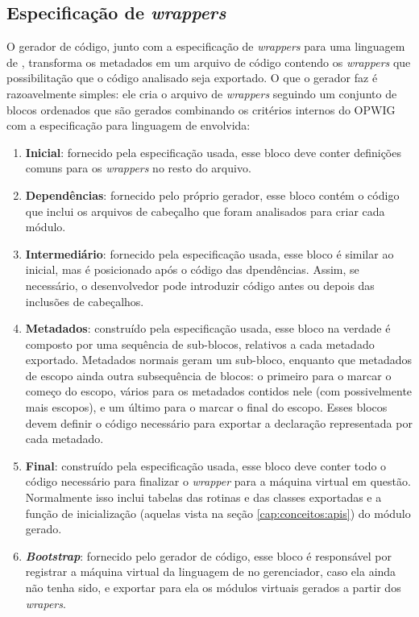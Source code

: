   \subsection{Especificação de \textit{wrappers}}
  O gerador de código, junto com a especificação de \textit{wrappers} para uma linguagem de \script{},
  transforma os metadados em um arquivo de código \CXX{} contendo os \textit{wrappers} que possibilitação
  que o código analisado seja exportado. O que o gerador faz é razoavelmente simples: ele cria o arquivo
  de \textit{wrappers} seguindo um conjunto de blocos ordenados que são gerados combinando os critérios
  internos do OPWIG com a especificação para linguagem de \script{} envolvida:
  \begin{enumerate}
    \item \textbf{Inicial}: fornecido pela especificação usada, esse bloco deve conter
      definições comuns para os \textit{wrappers} no resto do arquivo.
    \item \textbf{Dependências}: fornecido pelo próprio gerador, esse bloco contém o código
      que inclui os arquivos de cabeçalho que foram analisados para criar cada módulo.
    \item \textbf{Intermediário}: fornecido pela especificação usada, esse bloco é similar ao 
      inicial, mas é posicionado após o código das dpendências. Assim, se necessário,
      o desenvolvedor pode introduzir código antes ou depois das inclusões de cabeçalhos.
    \item \textbf{Metadados}: construído pela especificação usada, esse bloco na verdade é
      composto por uma sequência de sub-blocos, relativos a cada metadado exportado. Metadados
      normais geram um sub-bloco, enquanto que metadados de escopo ainda outra subsequência de
      blocos: o primeiro para o marcar o começo do escopo, vários para os metadados contidos
      nele (com possivelmente mais escopos), e um último para o marcar o final do
      escopo. Esses blocos devem definir o código necessário para exportar a declaração
      representada por cada metadado.
    \item \textbf{Final}: construído pela especificação usada, esse bloco deve conter
      todo o código necessário para finalizar o \textit{wrapper} para a máquina virtual em questão.
      Normalmente isso inclui tabelas das rotinas e das classes exportadas e a função de inicialização
      (aquelas vista na seção \ref{cap:conceitos:apis}) do módulo gerado.
    \item \textbf{\textit{Bootstrap}}: fornecido pelo gerador de código, esse bloco é responsável por
      registrar a máquina virtual da linguagem de \script{} no gerenciador, caso ela ainda
      não tenha sido, e exportar para ela os módulos virtuais gerados a partir dos \textit{wrapers}.
  \end{enumerate}
  

